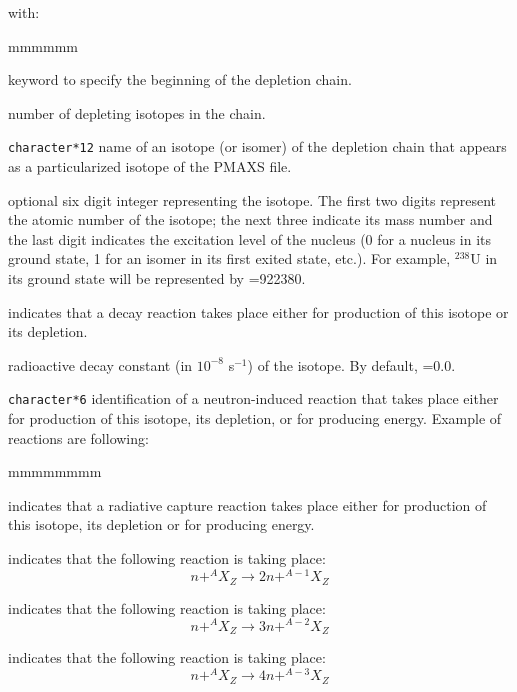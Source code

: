\noindent
with:

\begin{ListeDeDescription}{mmmmmm}

\item[\moc{CHAIN}] keyword to specify the beginning of the depletion chain.

\item[\dusa{nel}] number of depleting isotopes in the chain.

\item[\dusa{NAMDPL}] {\tt character*12} name of an isotope (or isomer) of the
depletion chain that appears as a particularized isotope of the PMAXS file.

\item[\dusa{izae}] optional six digit integer representing the isotope. The first two
digits represent the atomic number of the isotope; the next three indicate its
mass number and the last digit indicates the  excitation level of the nucleus (0
for a nucleus in its ground state, 1 for an isomer in its first exited state,
etc.). For example, $^{238}$U in its ground state will be represented by
=922380.

\item[\moc{DECAY}] indicates that a decay reaction takes place either for
production of this isotope or its depletion.

\item[\dusa{dcr}] radioactive decay constant (in $10^{-8}$ s$^{-1}$) of the
isotope. By default, =0.0.

\item[\dusa{reaction}] {\tt character*6} identification of a neutron-induced
reaction that takes place either for production of this isotope, its depletion,
or for producing energy. Example of reactions are following:

\begin{ListeDeDescription}{mmmmmmmm}
\item[\moc{NG}] indicates that a radiative capture reaction takes place either
for production of this isotope, its depletion or for producing energy.

\item[\moc{N2N}] indicates that the following reaction is taking place:
$$ n +^{A}X_Z \to 2 n + ^{A-1}X_Z$$

\item[\moc{N3N}] indicates that the following reaction is taking place:
$$ n +^{A}X_Z \to 3 n + ^{A-2}X_Z$$

\item[\moc{N4N}] indicates that the following reaction is taking place:
$$ n +^{A}X_Z \to 4 n + ^{A-3}X_Z$$


\end{ListeDeDescription}
\end{ListeDeDescription}
